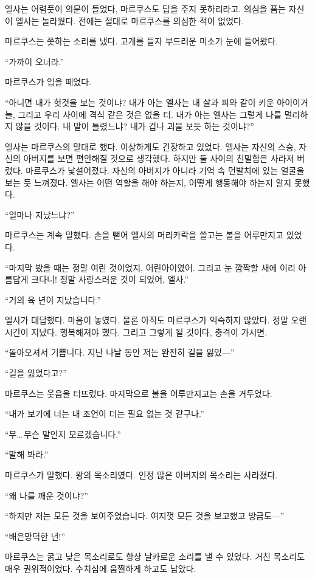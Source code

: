 엘사는 어렴풋이 의문이 들었다, 마르쿠스도 답을 주지 못하리라고. 의심을 품는 자신이 엘사는 놀라웠다. 전에는 절대로 마르쿠스를 의심한 적이 없었다.

마르쿠스는 쯧하는 소리를 냈다. 고개를 들자 부드러운 미소가 눈에 들어왔다.

``가까이 오너라.''

마르쿠스가 입을 떼었다.

``아니면 내가 헛것을 보는 것이냐? 내가 아는 엘사는 내 살과 피와 같이 키운 아이이거늘, 그리고 우리 사이에 격식 같은 것은 없을 터. 내가 아는 엘사는 그렇게 나를 멀리하지 않을 것이다. 내 말이 틀렸느냐? 내가 겁나 괴물 보듯 하는 것이냐?''

엘사는 마르쿠스의 말대로 했다. 이상하게도 긴장하고 있었다. 엘사는 자신의 스승, 자신의 아버지를 보면 편안해질 것으로 생각했다. 하지만 둘 사이의 친밀함은 사라져 버렸다. 마르쿠스가 낯설어졌다. 자신의 아버지가 아니라 기억 속 먼발치에 있는 얼굴을 보는 듯 느껴졌다. 엘사는 어떤 역할을 해야 하는지, 어떻게 행동해야 하는지 알지 못했다.

``얼마나 지났느냐?''

마르쿠스는 계속 말했다. 손을 뻗어 엘사의 머리카락을 쓸고는 볼을 어루만지고 있었다.

``마지막 봤을 때는 정말 여린 것이었지, 어린아이였어. 그리고 눈 깜짝할 새에 이리 아름답게 크다니! 정말 사랑스러운 것이 되었어, 엘사.''

``거의 육 년이 지났습니다.''

엘사가 대답했다. 마음이 놓였다. 물론 아직도 마르쿠스가 익숙하지 않았다. 정말 오랜 시간이 지났다. 행복해져야 했다. 그리고 그렇게 될 것이다, 충격이 가시면.

``돌아오셔서 기쁩니다. 지난 나날 동안 저는 완전히 길을 잃었—''

``길을 잃었다고?''

마르쿠스는 웃음을 터뜨렸다. 마지막으로 볼을 어루만지고는 손을 거두었다.

``내가 보기에 너는 내 조언이 더는 필요 없는 것 같구나.''

``무\ldots\,무슨 말인지 모르겠습니다.''

``말해 봐라.''

마르쿠스가 말했다. 왕의 목소리였다. 인정 많은 아버지의 목소리는 사라졌다.

``왜 나를 깨운 것이냐?''

``하지만 저는 모든 것을 보여주었습니다. 여지껏 모든 것을 보고했고 방금도—''

``배은망덕한 년!''

마르쿠스는 굵고 낮은 목소리로도 항상 날카로운 소리를 낼 수 있었다. 거친 목소리도 매우 권위적이었다. 수치심에 움찔하게 하고도 남았다.

